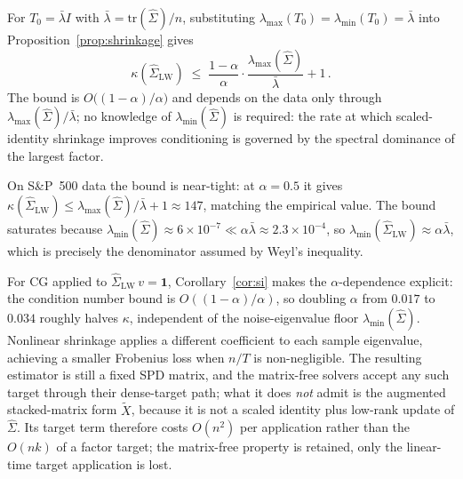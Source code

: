 \begin{corollary}\label{cor:si}
  For $T_0 = \bar\lambda I$ with $\bar\lambda = \mathrm{tr}(\hat\Sigma)/n$,
  substituting $\lambda_{\max}(T_0) = \lambda_{\min}(T_0) = \bar\lambda$ into
  Proposition~\ref{prop:shrinkage} gives
  \[
    \kappa(\hat\Sigma_{\mathrm{LW}}) \;\leq\;
    \frac{1-\alpha}{\alpha}\cdot\frac{\lambda_{\max}(\hat\Sigma)}{\bar\lambda} + 1\,.
  \]
  The bound is $O\!\bigl((1-\alpha)/\alpha\bigr)$ and depends on the data only through
  $\lambda_{\max}(\hat\Sigma)/\bar\lambda$; no knowledge of $\lambda_{\min}(\hat\Sigma)$
  is required: the rate at which scaled-identity shrinkage improves conditioning
  is governed by the spectral dominance of the largest factor.
\end{corollary}
On S\&P~500 data the bound is near-tight: at $\alpha=0.5$ it gives
$\kappa(\hat\Sigma_{\mathrm{LW}}) \leq \lambda_{\max}(\hat\Sigma)/\bar\lambda + 1 \approx 147$,
matching the empirical value.
The bound saturates because $\lambda_{\min}(\hat\Sigma) \approx 6\times10^{-7} \ll \alpha\bar\lambda \approx 2.3\times10^{-4}$,
so $\lambda_{\min}(\hat\Sigma_{\mathrm{LW}}) \approx \alpha\bar\lambda$, which is precisely
the denominator assumed by Weyl's inequality.


For CG applied to $\hat\Sigma_{\mathrm{LW}}\,v = \mathbf{1}$,
Corollary~\ref{cor:si} makes the $\alpha$-dependence explicit: the condition number
bound is $O((1-\alpha)/\alpha)$, so doubling $\alpha$ from $0.017$ to $0.034$ roughly
halves $\kappa$, independent of the noise-eigenvalue floor $\lambda_{\min}(\hat\Sigma)$.
Nonlinear shrinkage \cite{ledoit2020} applies a
different coefficient to each sample eigenvalue, achieving a smaller Frobenius loss
when $n/T$ is non-negligible. The resulting estimator is still a fixed SPD matrix, and
the matrix-free solvers accept any such target through their dense-target path; what it
does \emph{not} admit is the augmented stacked-matrix form $\tilde{X}$, because it is not
a scaled identity plus low-rank update of $\hat\Sigma$. Its target term therefore costs
$O(n^2)$ per application rather than the $O(nk)$ of a factor target; the matrix-free
property is retained, only the linear-time target application is lost.

